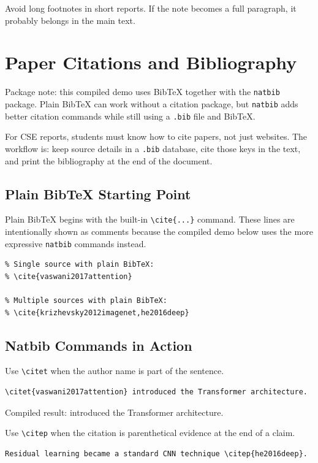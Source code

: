 \documentclass[11pt,a4paper]{article}
\begin{document}
Avoid long footnotes in short reports. If the note becomes a full paragraph,
it probably belongs in the main text.

\section{Paper Citations and Bibliography}

Package note: this compiled demo uses BibTeX together with the
\texttt{natbib} package. Plain BibTeX can work without a citation package, but
\texttt{natbib} adds better citation commands while still using a
\texttt{.bib} file and BibTeX.

For CSE reports, students must know how to cite papers, not just websites. The
workflow is: keep source details in a \texttt{.bib} database, cite those keys
in the text, and print the bibliography at the end of the document.

\subsection{Plain BibTeX Starting Point}

Plain BibTeX begins with the built-in \verb|\cite{...}| command. These lines
are intentionally shown as comments because the compiled demo below uses the
more expressive \texttt{natbib} commands instead.

\begin{verbatim}
% Single source with plain BibTeX:
% \cite{vaswani2017attention}

% Multiple sources with plain BibTeX:
% \cite{krizhevsky2012imagenet,he2016deep}
\end{verbatim}

\subsection{Natbib Commands in Action}

Use \verb|\citet| when the author name is part of the sentence.

\begin{verbatim}
\citet{vaswani2017attention} introduced the Transformer architecture.
\end{verbatim}

Compiled result: \citet{vaswani2017attention} introduced the Transformer
architecture.

Use \verb|\citep| when the citation is parenthetical evidence at the end of a
claim.

\begin{verbatim}
Residual learning became a standard CNN technique \citep{he2016deep}.
\end{verbatim}
\end{document}
